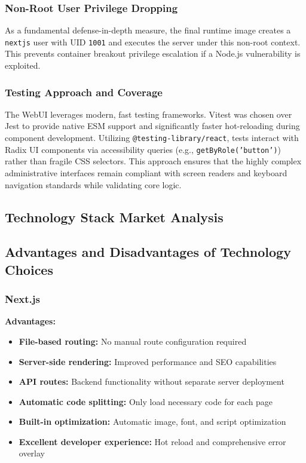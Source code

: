 \subsubsection{Non-Root User Privilege Dropping}
As a fundamental defense-in-depth measure, the final runtime image creates a \texttt{nextjs} user with UID \texttt{1001} and executes the server under this non-root context. This prevents container breakout privilege escalation if a Node.js vulnerability is exploited.

\subsubsection{Testing Approach and Coverage}
The WebUI leverages modern, fast testing frameworks. Vitest was chosen over Jest to provide native ESM support and significantly faster hot-reloading during component development. Utilizing \texttt{@testing-library/react}, tests interact with Radix UI components via accessibility queries (e.g., \texttt{getByRole('button')}) rather than fragile CSS selectors. This approach ensures that the highly complex administrative interfaces remain compliant with screen readers and keyboard navigation standards while validating core logic.

\subsection{Technology Stack Market Analysis}

\subsection{Advantages and Disadvantages of Technology Choices}

\subsubsection{Next.js}

\textbf{Advantages:}
\begin{itemize}
    \item \textbf{File-based routing:} No manual route configuration required
    \item \textbf{Server-side rendering:} Improved performance and SEO capabilities
    \item \textbf{API routes:} Backend functionality without separate server deployment
    \item \textbf{Automatic code splitting:} Only load necessary code for each page
    \item \textbf{Built-in optimization:} Automatic image, font, and script optimization
    \item \textbf{Excellent developer experience:} Hot reload and comprehensive error overlay
\end{itemize}

